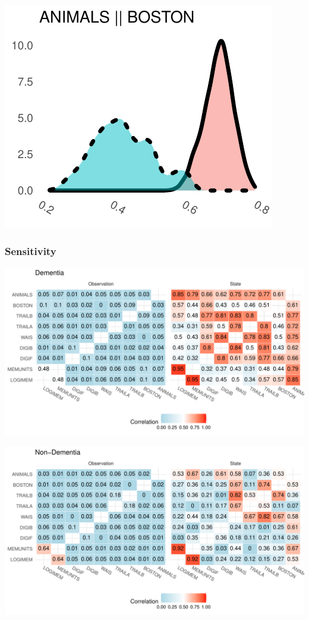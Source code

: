 \documentclass[
]{article}
\begin{document}
\includegraphics{DataAnalysis_files/figure-latex/unnamed-chunk-8-23.pdf}

\hypertarget{sensitivity}{%
\subsubsection{Sensitivity}\label{sensitivity}}

\includegraphics{DataAnalysis_files/figure-latex/unnamed-chunk-9-1.pdf}

\includegraphics{DataAnalysis_files/figure-latex/unnamed-chunk-10-1.pdf}
\end{document}
